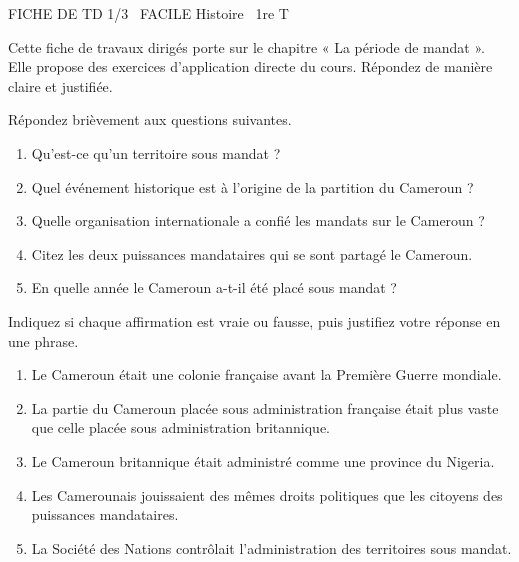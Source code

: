 \documentclass[11pt]{article}
\begin{document}
\begin{tcolorbox}[enhanced,colback=popink,colframe=popink,arc=10pt,boxrule=0pt,left=12pt,right=12pt,top=9pt,bottom=9pt]
{\color{white}\popxbold\small FICHE DE TD 1/3 \textbullet\ FACILE \hfill Histoire \textbullet\ 1re T\par}
\end{tcolorbox}
\vspace{4pt}
Cette fiche de travaux dirigés porte sur le chapitre « La période de mandat ». Elle propose des exercices d'application directe du cours. Répondez de manière claire et justifiée.

\begin{exercice}
Répondez brièvement aux questions suivantes.
\begin{enumerate}
\item Qu'est-ce qu'un territoire sous mandat ?
\item Quel événement historique est à l'origine de la partition du Cameroun ?
\item Quelle organisation internationale a confié les mandats sur le Cameroun ?
\item Citez les deux puissances mandataires qui se sont partagé le Cameroun.
\item En quelle année le Cameroun a-t-il été placé sous mandat ?
\end{enumerate}
\end{exercice}

\begin{exercice}
Indiquez si chaque affirmation est vraie ou fausse, puis justifiez votre réponse en une phrase.
\begin{enumerate}
\item Le Cameroun était une colonie française avant la Première Guerre mondiale.
\item La partie du Cameroun placée sous administration française était plus vaste que celle placée sous administration britannique.
\item Le Cameroun britannique était administré comme une province du Nigeria.
\item Les Camerounais jouissaient des mêmes droits politiques que les citoyens des puissances mandataires.
\item La Société des Nations contrôlait l'administration des territoires sous mandat.
\end{enumerate}
\end{exercice}
\end{document}
